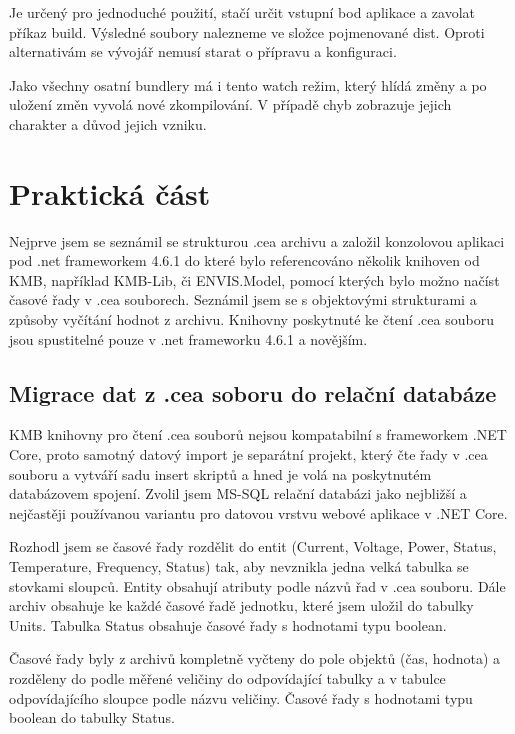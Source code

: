\documentclass[FM,BP]{tulthesis}
\begin{document}
                Je určený pro jednoduché použití, stačí určit vstupní bod aplikace a zavolat příkaz build. 
                Výsledné soubory nalezneme ve složce pojmenované dist. 
                Oproti alternativám se vývojář nemusí starat o přípravu a konfiguraci.

                Jako všechny osatní bundlery má i tento watch režim, který hlídá změny a po uložení změn vyvolá nové zkompilování. 
                V případě chyb zobrazuje jejich charakter a důvod jejich vzniku. \cite{17}

\chapter{Praktická část}
    Nejprve jsem se seznámil se strukturou .cea archivu a založil konzolovou aplikaci pod .net frameworkem 4.6.1 do které bylo referencováno několik knihoven od KMB, 
    například KMB-Lib, či ENVIS.Model, pomocí kterých bylo možno načíst časové řady v .cea souborech. 
    Seznámil jsem se s objektovými strukturami a způsoby vyčítání hodnot z archivu. 
    Knihovny poskytnuté ke čtení .cea souboru jsou spustitelné pouze v .net frameworku 4.6.1 a novějším.

    \section{Migrace dat z .cea soboru do relační databáze}
        KMB knihovny pro čtení .cea souborů nejsou kompatabilní s frameworkem .NET Core, proto samotný datový import je separátní projekt, 
        který čte řady v .cea souboru a vytváří sadu insert skriptů a hned je volá na poskytnutém databázovem spojení. 
        Zvolil jsem MS-SQL relační databázi jako nejbližší a nejčastěji používanou variantu pro datovou vrstvu webové aplikace v .NET Core. \cite{1}

        Rozhodl jsem se časové řady rozdělit do entit (Current, Voltage, Power, Status, Temperature, Frequency, Status) tak, aby nevznikla jedna velká tabulka se stovkami sloupců. 
        Entity obsahují atributy podle názvů řad v .cea souboru. 
        Dále archiv obsahuje ke každé časové řadě jednotku, které jsem uložil do tabulky Units.
        Tabulka Status obsahuje časové řady s hodnotami typu boolean. 

        Časové řady byly z archivů kompletně vyčteny do pole objektů (čas, hodnota) a rozděleny do podle měřené veličiny do odpovídající tabulky 
        a v tabulce odpovídajícího sloupce podle názvu veličiny.
        Časové řady s hodnotami typu boolean do tabulky Status.
        
\end{document}
